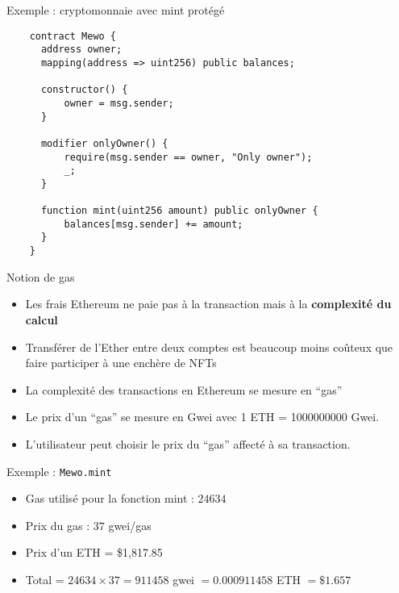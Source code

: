 \begin{frame}[fragile]{Exemple : cryptomonnaie avec mint protégé}
  \begin{verbatim}
    contract Mewo {
      address owner;
      mapping(address => uint256) public balances;

      constructor() {
          owner = msg.sender;
      }
    
      modifier onlyOwner() {
          require(msg.sender == owner, "Only owner");
          _;
      }
    
      function mint(uint256 amount) public onlyOwner {
          balances[msg.sender] += amount;
      }
    }
  \end{verbatim}
\end{frame}

\begin{frame}{Notion de gas}
  \begin{itemize}
    \item Les frais Ethereum ne paie pas à la transaction mais à la \textbf{complexité du calcul}
    \item Transférer de l'Ether entre deux comptes est beaucoup moins coûteux que faire participer à une enchère de NFTs
    \item La complexité des transactions en Ethereum se mesure en \enquote{gas}
    \item Le prix d'un \enquote{gas} se mesure en Gwei avec 1 ETH = 1000000000 Gwei.
    \item L'utilisateur peut choisir le prix du \enquote{gas} affecté à sa transaction.
  \end{itemize}

  \begin{block}{Exemple : \texttt{Mewo.mint}}
    \begin{itemize}
      \item Gas utilisé pour la fonction mint : $24634$
      \item Prix du gas : $37$ gwei/gas
      \item Prix d'un ETH = \$1,817.85
      \item Total = $24634\times37=911458$ gwei $= 0.000911458$ ETH $ = \$1.657$
    \end{itemize}
  \end{block}
\end{frame}